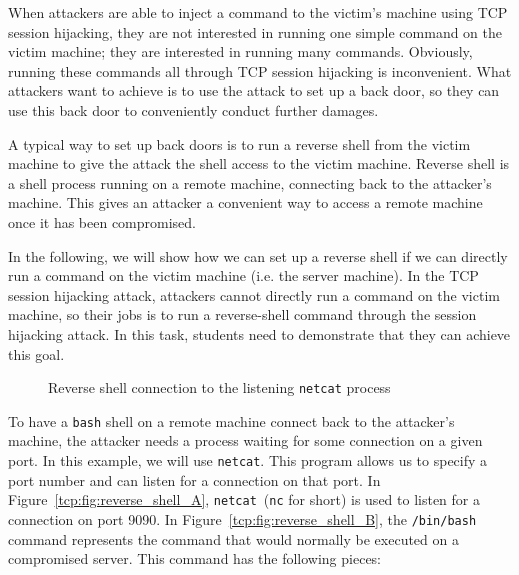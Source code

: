 When attackers are able to inject a command to the victim's machine using
TCP session hijacking, they are not interested in running one simple
command on the victim machine; they are interested in running many
commands. Obviously, running these commands all through TCP session
hijacking is inconvenient. What attackers want to achieve is to use the
attack to set up a back door, so they can use this
back door to conveniently conduct further damages.

A typical way to set up back doors is to run a reverse shell from the
victim machine to give the attack the shell access to the victim machine.
Reverse shell is a shell process running on a remote machine, connecting
back to the attacker's machine. This gives an attacker a convenient way to
access a remote machine once it has been compromised. 


In the following, we will show how we can set up a reverse shell if we can
directly run a command on the victim machine (i.e. the server machine). 
In the TCP session hijacking attack, attackers cannot directly run a
command on the victim machine, so their jobs is to run a reverse-shell
command through the session hijacking attack. 
In this task, students need to demonstrate that they can achieve this goal.



\begin{figure}[htb]
\centering
{}
\caption{Reverse shell connection to the listening \texttt{netcat} process}
\label{tcp:fig:reverse_shell}
\end{figure}


To have a \texttt{bash} shell on a remote machine connect back to the attacker's machine, the
attacker needs a process waiting for some connection on a given port. In this example, we will
use \texttt{netcat}. This program allows us to specify a port
number and can listen for a connection on that port.
In Figure~\ref{tcp:fig:reverse_shell_A}, \texttt{netcat}~(\texttt{nc} for short) is used
to listen for a connection on port 9090.
In Figure~\ref{tcp:fig:reverse_shell_B}, the \texttt{/bin/bash} command represents the command that
would normally be executed on a compromised server. This command has the following pieces:

